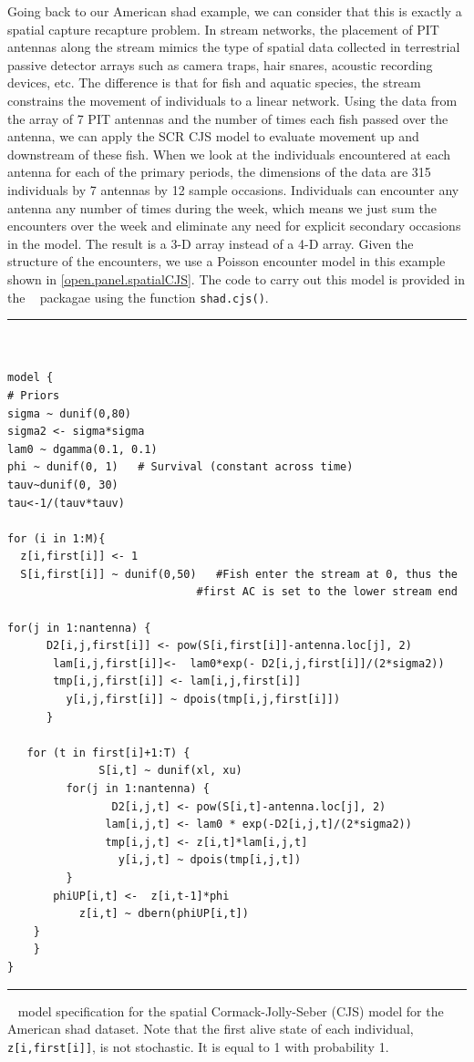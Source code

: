 Going back to our American shad example, we can consider that this is
exactly a spatial capture recapture problem.  In stream networks, the
placement of PIT antennas along the stream mimics the type of spatial
data collected in terrestrial passive detector arrays such as camera
traps, hair snares, acoustic recording devices, etc.  The difference
is that for fish and aquatic species, the stream constrains the
movement of individuals to a linear network.  Using the data from the
array of 7 PIT antennas and the number of times each fish passed over
the antenna, we can apply the SCR CJS model to evaluate movement up
and downstream of these fish.  When we look at the individuals
encountered at each antenna for each of the primary periods, the
dimensions of the data are 315 individuals by 7 antennas by 12 sample
occasions. Individuals can encounter any antenna any number of times
during the week, which means we just sum the encounters over the week
and eliminate any need for explicit secondary occasions in the
model. The result is a 3-D array instead of a 4-D array.  Given the
structure of the encounters, we use a Poisson encounter model in this
example shown in \ref{open.panel.spatialCJS}.  The code to carry out
this model is provided in the \scrbook~ packagae using the function
\verb+shad.cjs()+.


\begin{panel}[htp]
\centering
\rule[0.1in]{\textwidth}{.03in}
{\small
\begin{verbatim}


model {
# Priors
sigma ~ dunif(0,80)
sigma2 <- sigma*sigma
lam0 ~ dgamma(0.1, 0.1)
phi ~ dunif(0, 1)   # Survival (constant across time)
tauv~dunif(0, 30)
tau<-1/(tauv*tauv)

for (i in 1:M){
  z[i,first[i]] <- 1
  S[i,first[i]] ~ dunif(0,50)   #Fish enter the stream at 0, thus the
			                 #first AC is set to the lower stream end

for(j in 1:nantenna) {
	  D2[i,j,first[i]] <- pow(S[i,first[i]]-antenna.loc[j], 2)
       lam[i,j,first[i]]<-  lam0*exp(- D2[i,j,first[i]]/(2*sigma2))
       tmp[i,j,first[i]] <- lam[i,j,first[i]]
         y[i,j,first[i]] ~ dpois(tmp[i,j,first[i]])
      }

   for (t in first[i]+1:T) {
	          S[i,t] ~ dunif(xl, xu) 
         for(j in 1:nantenna) {
		        D2[i,j,t] <- pow(S[i,t]-antenna.loc[j], 2)
               lam[i,j,t] <- lam0 * exp(-D2[i,j,t]/(2*sigma2))
	           tmp[i,j,t] <- z[i,t]*lam[i,j,t]
		         y[i,j,t] ~ dpois(tmp[i,j,t])
		 }
 	   phiUP[i,t] <-  z[i,t-1]*phi
	       z[i,t] ~ dbern(phiUP[i,t])
	}
	}
}
\end{verbatim}
}
\rule[-0.1in]{\textwidth}{.03in}
\caption{
\jags~ model specification for the spatial
Cormack-Jolly-Seber (CJS) model for the American shad dataset. Note that the first alive state of
each individual, \mbox{\tt z[i,first[i]]}, is not stochastic. It is
equal to 1 with probability 1.}
\label{open.panel.spatialCJS}
\end{panel}







